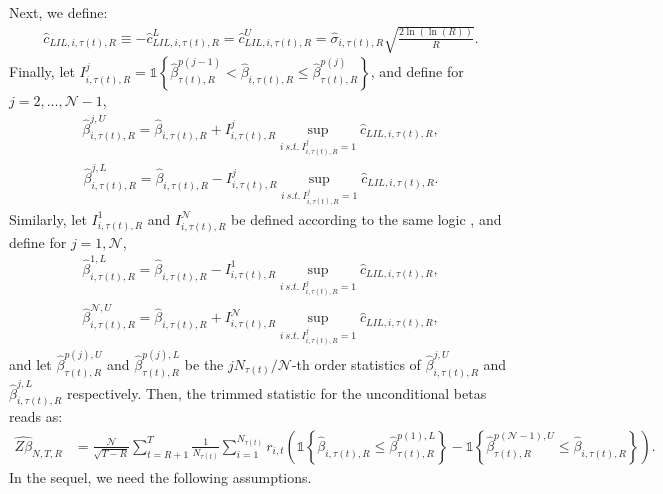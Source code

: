 Next, we define:
\begin{align*}
    \widehat{c}_{LIL,i,\tau(t),R} \equiv - \widehat{c}^L_{LIL,i,\tau(t),R} = \widehat{c}^U_{LIL,i,\tau(t),R} = \widehat{\sigma}_{i,\tau(t),R} \sqrt{\frac{2 \ln \left( \ln \left( R \right) \right)}{R}}.
\end{align*}
Finally, let $I_{i,\tau(t),R}^j = \mathds{1} \left\{ \widehat{\beta}_{\tau(t),R}^{p(j-1)} <\widehat{\beta}_{i,\tau(t),R} \leq \widehat{\beta}_{\tau(t),R}^{p(j)} \right\}$, and define for $j=2,\dots,\mathcal{N}-1$, 
\begin{align*}
	\widehat{\beta}_{i,\tau(t),R}^{j,U} = \widehat{\beta}_{i,\tau(t),R} + I_{i,\tau(t),R}^j \sup_{i \ s.t. \ I_{i,\tau(t),R}^j=1} \widehat{c}_{LIL,i,\tau(t),R},
\end{align*}
\begin{align*}
	\widehat{\beta}_{i,\tau(t),R}^{j,L} = \widehat{\beta}_{i,\tau(t),R} - I_{i,\tau(t),R}^j \sup_{i \ s.t. \ I_{i,\tau(t),R}^j=1} \widehat{c}_{LIL,i,\tau(t),R}.
\end{align*}
Similarly, let $I_{i,\tau(t),R}^1$ and $I_{i,\tau(t),R}^\mathcal{N}$ be defined according to the same logic %
, and define for $j=1, \mathcal{N}$,
\begin{align*}
	\widehat{\beta}_{i,\tau(t),R}^{1,L} = \widehat{\beta}_{i,\tau(t),R} - I_{i,\tau(t),R}^1 \sup_{i \ s.t. \ I_{i,\tau(t),R}^j=1} \widehat{c}_{LIL,i,\tau(t),R},
\end{align*}
\begin{align*}
	\widehat{\beta}_{i,\tau(t),R}^{\mathcal{N},U} = \widehat{\beta}_{i,\tau(t),R} + I_{i,\tau(t),R}^\mathcal{N} \sup_{i \ s.t. \ I_{i,\tau(t),R}^j=1} \widehat{c}_{LIL,i,\tau(t),R},
\end{align*}
and let $\widehat{\beta}_{\tau(t),R}^{p(j),U}$ and $\widehat{\beta}_{\tau(t),R}^{p(j),L}$ be the $jN_{\tau(t)}/\mathcal{N}$-th order statistics of $\widehat{\beta}_{i,\tau(t),R}^{j,U}$ and $\widehat{\beta}_{i,\tau(t),R}^{j,L}$ respectively. Then, the trimmed statistic for the unconditional betas reads as:
\begin{align}
    \widehat{Z\beta}_{N,T,R} &= \frac{\mathcal{N}}{\sqrt{T-R}}\sum_{t=R+1}^{T} \frac{1}{N_{\tau(t)}}\sum_{i=1}^{N_{\tau(t)}}r_{i,t}\left( \mathds{1}\left\{ \widehat{\beta }_{i,\tau(t),R}\leq  \widehat{\beta }_{\tau(t),R}^{p(1),L}\right\} -\mathds{1}\left\{ \widehat{\beta }_{\tau(t),R}^{p(\mathcal{N}-1),U}\leq \widehat{\beta }_{i,\tau(t),R} \right\} \right).  \label{Zbeta}
\end{align}
In the sequel, we need the following assumptions.


